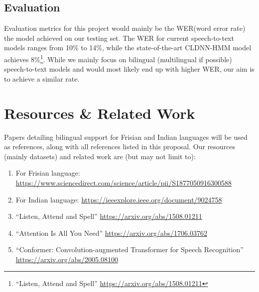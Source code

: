 \documentclass{article}
\begin{document}
  \subsection{Evaluation}
  Evaluation metrics for this project would mainly be the WER(word error rate) the model achieved on our testing set. The WER for current speech-to-text models ranges from 10\% to 14\%, while the state-of-the-art  CLDNN-HMM model achieves 8\%\footnote{“Listen, Attend and Spell” \url{https://arxiv.org/abs/1508.01211}}. While we mainly focus on bilingual (multilingual if possible) speech-to-text models and would most likely end up with higher WER, our aim is to achieve a similar rate.
  \section{Resources \& Related Work}
  Papers detailing bilingual support for Frisian and Indian languages will be used as references, along with all references listed in this proposal. Our resources (mainly datasets) and related work are (but may not limit to):
  \begin{enumerate}
    \item For Frisian language: \url{https://www.sciencedirect.com/science/article/pii/S1877050916300588}
    \item For Indian language: \url{https://ieeexplore.ieee.org/document/9024758}
    \item “Listen, Attend and Spell” \url{https://arxiv.org/abs/1508.01211}
    \item “Attention Is All You Need” \url{https://arxiv.org/abs/1706.03762}
    \item “Conformer: Convolution-augmented Transformer for Speech Recognition” \url{https://arxiv.org/abs/2005.08100}
  \end{enumerate}
\end{document}
